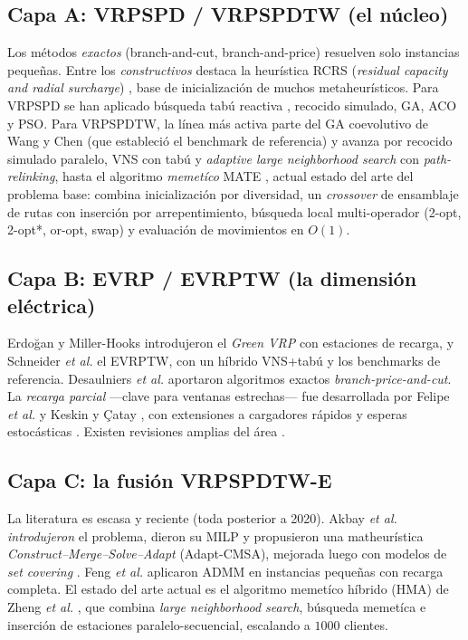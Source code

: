 \documentclass[conference]{IEEEtran}
\begin{document}
\subsection{Capa A: VRPSPD / VRPSPDTW (el n\'ucleo)}
Los m\'etodos \emph{exactos} (branch-and-cut, branch-and-price) resuelven solo
instancias peque\~nas. Entre los \emph{constructivos} destaca la heur\'istica
RCRS (\emph{residual capacity and radial surcharge}) \cite{dethloff2001}, base de
inicializaci\'on de muchos metaheur\'isticos. Para VRPSPD se han aplicado
b\'usqueda tab\'u reactiva \cite{wassan2008}, recocido simulado, GA, ACO y PSO.
Para VRPSPDTW, la l\'inea m\'as activa parte del GA coevolutivo de Wang y Chen
\cite{wangchen2012} (que estableci\'o el benchmark de referencia) y avanza por
recocido simulado paralelo, VNS con tab\'u y \emph{adaptive large neighborhood
search} con \emph{path-relinking}, hasta el algoritmo \emph{memet\'ico} MATE
\cite{liu2021mate}, actual estado del arte del problema base: combina
inicializaci\'on por diversidad, un \emph{crossover} de ensamblaje de rutas con
inserci\'on por arrepentimiento, b\'usqueda local multi-operador (2-opt, 2-opt*,
or-opt, swap) y evaluaci\'on de movimientos en $O(1)$.

\subsection{Capa B: EVRP / EVRPTW (la dimensi\'on el\'ectrica)}
Erdo\u{g}an y Miller-Hooks \cite{erdogan2012green} introdujeron el \emph{Green
VRP} con estaciones de recarga, y Schneider \emph{et al.}
\cite{schneider2014evrptw} el EVRPTW, con un h\'ibrido VNS+tab\'u y los
benchmarks de referencia. Desaulniers \emph{et al.} \cite{desaulniers2016exact}
aportaron algoritmos exactos \emph{branch-price-and-cut}. La \emph{recarga
parcial} ---clave para ventanas estrechas--- fue desarrollada por Felipe
\emph{et al.} \cite{felipe2014} y Keskin y \c{C}atay \cite{keskin2016partial},
con extensiones a cargadores r\'apidos \cite{keskin2018fast} y esperas
estoc\'asticas \cite{keskin2021stochastic}. Existen revisiones amplias del \'area
\cite{kucukoglu2021review,qin2021review}.

\subsection{Capa C: la fusi\'on VRPSPDTW-E}
La literatura es escasa y reciente (toda posterior a 2020). Akbay \emph{et al.}
\cite{akbay2022cmsa} \emph{introdujeron} el problema, dieron su MILP y propusieron
una matheur\'istica \emph{Construct--Merge--Solve--Adapt} (Adapt-CMSA),
mejorada luego con modelos de \emph{set covering} \cite{akbay2024setcov}. Feng
\emph{et al.} \cite{feng2023admm} aplicaron ADMM en instancias peque\~nas con
recarga completa. El estado del arte actual es el algoritmo memet\'ico h\'ibrido
(HMA) de Zheng \emph{et al.} \cite{zheng2025hma}, que combina \emph{large
neighborhood search}, b\'usqueda memet\'ica e inserci\'on de estaciones
paralelo-secuencial, escalando a $1000$ clientes.
\end{document}
